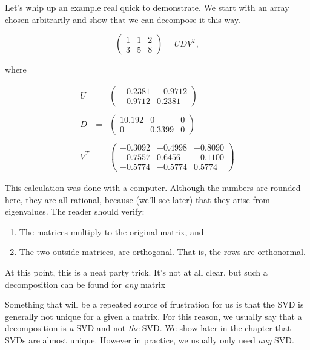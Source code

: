 \documentclass{amsbook}
\begin{document}
\begin{tcolorbox}[title=Example,colback=blue!5]
Let's whip up an example real quick to demonstrate.  We start with an array chosen arbitrarily and show that we can decompose it this way.

$$
\left(
\begin{array}{ccc}
1 & 1 & 2 \\ 3 & 5 & 8
\end{array}
\right) = UDV^T,
$$

where

$$
\begin{array}{rcl}
U &=& \left(
\begin{array}{cc}
-0.2381 & -0.9712 \\
-0.9712 & 0.2381
\end{array}
\right)\\
\\
D&=&\left(
\begin{array}{ccc}
10.192 & 0 & 0 \\
0 & 0.3399 & 0
\end{array}
\right)\\
\\
V^T&=&\left(
\begin{array}{ccc}
-0.3092 & -0.4998 & -0.8090 \\
-0.7557 & 0.6456 & -0.1100 \\
-0.5774 & -0.5774 & 0.5774
\end{array}
\right)
\end{array}
$$
 
This calculation was done with a computer.  Although the numbers are rounded here, they are all rational, because (we'll see later) that they arise from eigenvalues.  The reader should verify:

\begin{enumerate}
\item The matrices multiply to the original matrix, and
\item The two outside matrices, are orthogonal.  That is, the rows are orthonormal.
\end{enumerate}

At this point, this is a neat party trick.  It's not at all clear, but such a decomposition can be found for {\em any} matrix
\end{tcolorbox}

Something that will be a repeated source of frustration for us is that the SVD is generally not unique for a given a matrix.  For this reason, we usually say that a decomposition is {\em a} SVD and not {\em the} SVD.  We show later in the chapter that SVDs are almost unique.  However in practice, we usually only need {\em any} SVD.
\end{document}
